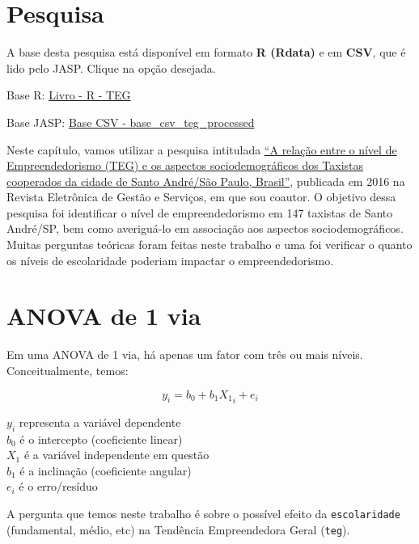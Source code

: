 \documentclass[
]{book}
\begin{document}
\hypertarget{pesquisa-3}{%
\section{Pesquisa}\label{pesquisa-3}}

\begin{base}

A base desta pesquisa está disponível em formato \textbf{R (Rdata)} e em
\textbf{CSV}, que é lido pelo JASP. Clique na opção desejada.

Base R:
\href{https://github.com/anovabr/mqt/raw/master/bases/Livro\%20-\%20R\%20-\%20TEG.RData}{Livro
- R - TEG}

Base JASP:
\href{https://github.com/anovabr/mqt/raw/master/bases/bases_csv_jasp.zip}{Base
CSV - base\_csv\_teg\_processed}

\end{base}

Neste capítulo, vamos utilizar a pesquisa intitulada
\href{https://www.metodista.br/revistas/revistas-metodista/index.php/REGS/article/view/6453}{``A
relação entre o nível de Empreendedorismo (TEG) e os aspectos
sociodemográficos dos Taxistas cooperados da cidade de Santo André/São
Paulo, Brasil''}, publicada em 2016 na Revista Eletrônica de Gestão e
Serviços, em que sou coautor. O objetivo dessa pesquisa foi identificar
o nível de empreendedorismo em 147 taxistas de Santo André/SP, bem como
averiguá-lo em associação aos aspectos sociodemográficos. Muitas
perguntas teóricas foram feitas neste trabalho e uma foi verificar o
quanto os níveis de escolaridade poderiam impactar o empreendedorismo.

\hypertarget{anova-de-1-via}{%
\section{ANOVA de 1 via}\label{anova-de-1-via}}

Em uma ANOVA de 1 via, há apenas um fator com três ou mais níveis.
Conceitualmente, temos:

\[y_i = b_0 + b_1X{_1}_i + e_i\]

\(y_i\) representa a variável dependente\\
\(b_0\) é o intercepto (coeficiente linear)\\
\(X_1\) é a variável independente em questão\\
\(b_1\) é a inclinação (coeficiente angular)\\
\(e_i\) é o erro/resíduo

A pergunta que temos neste trabalho é sobre o possível efeito da
\texttt{escolaridade} (fundamental, médio, etc) na Tendência
Empreendedora Geral (\texttt{teg}).
\end{document}

